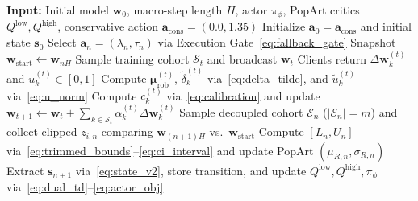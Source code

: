 \begin{algorithm}[t]
\caption{FedTC v2.1 Closed-Loop Trust Calibration}
\label{alg:fedtc}
\begin{algorithmic}[1]
\STATE \textbf{Input:} Initial model $\mathbf{w}_0$, macro-step length $H$, actor $\pi_\phi$, PopArt critics $Q^{\mathrm{low}}, Q^{\mathrm{high}}$, conservative action $\mathbf{a}_{\mathrm{cons}} = (0.0, 1.35)$
\STATE Initialize $\mathbf{a}_0 = \mathbf{a}_{\mathrm{cons}}$ and initial state $\mathbf{s}_0$
    \STATE Select $\mathbf{a}_n = (\lambda_n, \tau_n)$ via Execution Gate~\eqref{eq:fallback_gate}
    \STATE Snapshot $\mathbf{w}_{\mathrm{start}} \leftarrow \mathbf{w}_{nH}$
        \STATE Sample training cohort $\mathcal{S}_t$ and broadcast $\mathbf{w}_t$
        \STATE Clients return $\Delta\mathbf{w}_k^{(t)}$ and $u_k^{(t)} \in [0, 1]$
        \STATE Compute $\boldsymbol{\mu}_{\mathrm{rob}}^{(t)}$, $\tilde{\delta}_k^{(t)}$ via~\eqref{eq:delta_tilde}, and $\tilde{u}_k^{(t)}$ via~\eqref{eq:u_norm}
        \STATE Compute $c_k^{(t)}$ via~\eqref{eq:calibration} and update $\mathbf{w}_{t+1} \leftarrow \mathbf{w}_t + \sum_{k\in\mathcal{S}_t} \alpha_k^{(t)}\Delta\mathbf{w}_k^{(t)}$
    \ENDFOR
    \STATE Sample decoupled cohort $\mathcal{E}_n$ ($|\mathcal{E}_n|=m$) and collect clipped $z_{i,n}$ comparing $\mathbf{w}_{(n+1)H}$ vs.\ $\mathbf{w}_{\mathrm{start}}$
    \STATE Compute $[L_n, U_n]$ via~\eqref{eq:trimmed_bounds}--\eqref{eq:ci_interval} and update PopArt $(\mu_{R,n}, \sigma_{R,n})$
    \STATE Extract $\mathbf{s}_{n+1}$ via~\eqref{eq:state_v2}, store transition, and update $Q^{\mathrm{low}}, Q^{\mathrm{high}}, \pi_\phi$ via~\eqref{eq:dual_td}--\eqref{eq:actor_obj}
\ENDFOR
\end{algorithmic}
\end{algorithm}
